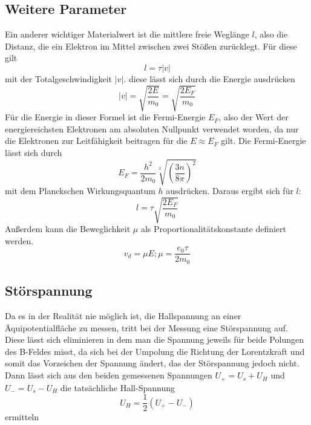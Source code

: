 \subsection{Weitere Parameter}
Ein anderer wichtiger Materialwert ist die mittlere freie Weglänge $l$, also die Distanz, die ein Elektron im Mittel zwischen zwei Stößen zurücklegt. Für diese gilt
\begin{equation}
l=\tau \vert v \vert
\end{equation}  
mit der Totalgeschwindigkeit $\vert v \vert$. diese lässt sich durch die Energie ausdrücken
\begin{equation}
\vert v \vert=\sqrt{\frac{2E}{m_0}}=\sqrt{\frac{2E_F}{m_0}}
\end{equation}
Für die Energie in dieser Formel ist die Fermi-Energie $E_F$, also der Wert der energiereichsten Elektronen am absoluten Nullpunkt verwendet worden, da nur die Elektronen zur Leitfähigkeit beitragen für die $E\approx E_F$ gilt. Die Fermi-Energie lässt sich durch
\begin{equation}
E_F=\frac{h^2}{2m_0}\sqrt[3]{(\frac{3n}{8\pi})^2}
\end{equation}
mit dem Planckschen Wirkungsquantum $h$ ausdrücken. Daraus ergibt sich für $l$:
\begin{equation}
   l=\tau\sqrt{\frac{2E_F}{m_0}}
\end{equation}
Außerdem kann die Beweglichkeit $\mu$ als Proportionalitätskonstante definiert werden.
\begin{equation}
v_d=\mu E;\mu=\frac{e_0\tau}{2m_0}
\end{equation}
\subsection{Störspannung}
Da es in der Realität nie möglich ist, die Hallspannung an einer Äquipotentialfläche zu messen, tritt bei der Messung eine Störspannung auf. Diese lässt sich eliminieren in dem man die Spannung jeweils für beide Polungen des B-Feldes misst, da sich
bei der Umpolung die Richtung der Lorentzkraft und somit das Vorzeichen der Spannung ändert, das der Störspannung jedoch nicht. Dann lässt sich aus den beiden gemessenen Spannungen $U_+=U_s+U_H$ und $U_-=U_s-U_H$ die tatsächliche Hall-Spannung
\begin{equation}
U_H=\frac{1}{2}(U_+-U_-)
\end{equation}
 ermitteln
